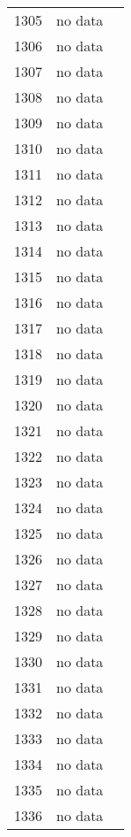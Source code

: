\begin{table}[p]
\begin{tabular}{rlr}
  1305 & no data &  \\ 
  1306 & no data &  \\ 
  1307 & no data &  \\ 
  1308 & no data &  \\ 
  1309 & no data &  \\ 
  1310 & no data &  \\ 
  1311 & no data &  \\ 
  1312 & no data &  \\ 
  1313 & no data &  \\ 
  1314 & no data &  \\ 
  1315 & no data &  \\ 
  1316 & no data &  \\ 
  1317 & no data &  \\ 
  1318 & no data &  \\ 
  1319 & no data &  \\ 
  1320 & no data &  \\ 
  1321 & no data &  \\ 
  1322 & no data &  \\ 
  1323 & no data &  \\ 
  1324 & no data &  \\ 
  1325 & no data &  \\ 
  1326 & no data &  \\ 
  1327 & no data &  \\ 
  1328 & no data &  \\ 
  1329 & no data &  \\ 
  1330 & no data &  \\ 
  1331 & no data &  \\ 
  1332 & no data &  \\ 
  1333 & no data &  \\ 
  1334 & no data &  \\ 
  1335 & no data &  \\ 
  1336 & no data &  \\ 
   \hline
\end{tabular}
\end{table}
